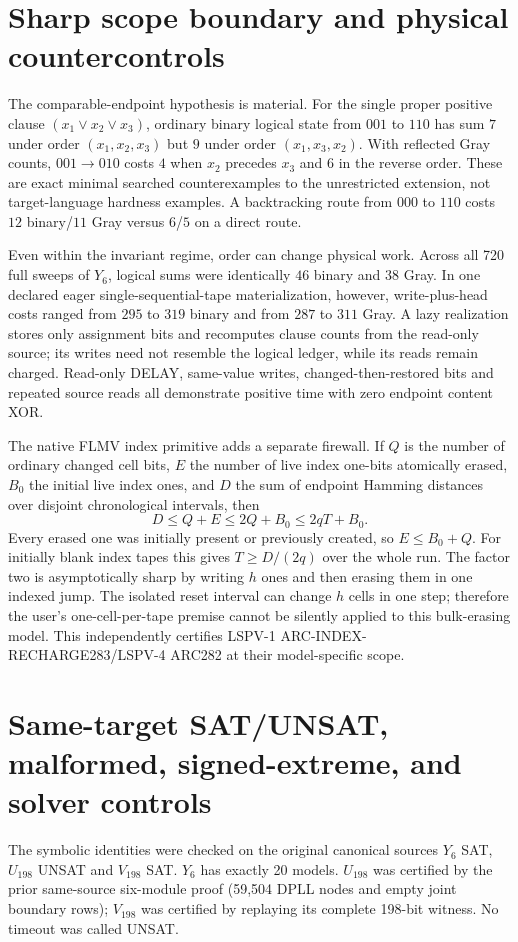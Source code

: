 \documentclass[11pt]{article}
\begin{document}
\section{Sharp scope boundary and physical countercontrols}
The comparable-endpoint hypothesis is material.  For the single proper positive clause
$(x_1\vee x_2\vee x_3)$, ordinary binary logical state from $001$ to $110$ has sum
$7$ under order $(x_1,x_2,x_3)$ but $9$ under order $(x_1,x_3,x_2)$.  With reflected
Gray counts, $001\to010$ costs $4$ when $x_2$ precedes $x_3$ and $6$ in the reverse
order.  These are exact minimal searched counterexamples to the unrestricted extension,
not target-language hardness examples.  A backtracking route from $000$ to $110$ costs
$12$ binary/$11$ Gray versus $6$/$5$ on a direct route.

Even within the invariant regime, order can change physical work.  Across all 720 full
sweeps of $Y_6$, logical sums were identically $46$ binary and $38$ Gray.  In one
declared eager single-sequential-tape materialization, however, write-plus-head costs
ranged from $295$ to $319$ binary and from $287$ to $311$ Gray.  A lazy realization
stores only assignment bits and recomputes clause counts from the read-only source;
its writes need not resemble the logical ledger, while its reads remain charged.
Read-only DELAY, same-value writes, changed-then-restored bits and repeated source reads
all demonstrate positive time with zero endpoint content XOR.

The native FLMV index primitive adds a separate firewall.  If $Q$ is the number of
ordinary changed cell bits, $E$ the number of live index one-bits atomically erased,
$B_0$ the initial live index ones, and $D$ the sum of endpoint Hamming distances over
disjoint chronological intervals, then
\[
 D\le Q+E\le2Q+B_0\le2qT+B_0.
\]
Every erased one was initially present or previously created, so $E\le B_0+Q$.
For initially blank index tapes this gives $T\ge D/(2q)$ over the whole run.  The factor
two is asymptotically sharp by writing $h$ ones and then erasing them in one indexed
jump.  The isolated reset interval can change $h$ cells in one step; therefore the
user's one-cell-per-tape premise cannot be silently applied to this bulk-erasing model.
This independently certifies LSPV-1 ARC-INDEX-RECHARGE283/LSPV-4 ARC282 at their
model-specific scope.

\section{Same-target SAT/UNSAT, malformed, signed-extreme, and solver controls}
The symbolic identities were checked on the original canonical sources $Y_6$ SAT,
$U_{198}$ UNSAT and $V_{198}$ SAT.  $Y_6$ has exactly 20 models.  $U_{198}$ was
certified by the prior same-source six-module proof (59,504 DPLL nodes and empty joint
boundary rows); $V_{198}$ was certified by replaying its complete 198-bit witness.
No timeout was called UNSAT.
\end{document}
